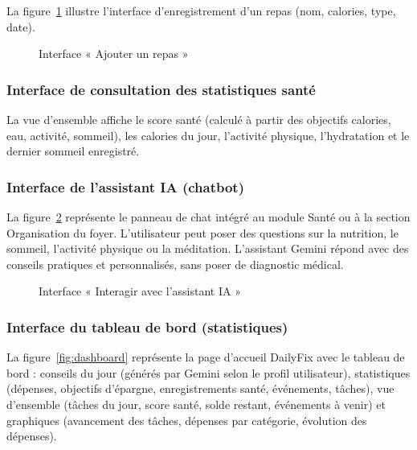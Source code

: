 La figure~\ref{fig:meal} illustre l'interface d'enregistrement d'un repas (nom, calories, type, date).

\begin{figure}[H]
\centering
\caption{Interface « Ajouter un repas »}
\label{fig:meal}
\end{figure}

\subsubsection{Interface de consultation des statistiques santé}

La vue d'ensemble affiche le score santé (calculé à partir des objectifs calories, eau, activité, sommeil), les calories du jour, l'activité physique, l'hydratation et le dernier sommeil enregistré.

\subsubsection{Interface de l'assistant IA (chatbot)}

La figure~\ref{fig:chatbot} représente le panneau de chat intégré au module Santé ou à la section Organisation du foyer. L'utilisateur peut poser des questions sur la nutrition, le sommeil, l'activité physique ou la méditation. L'assistant Gemini répond avec des conseils pratiques et personnalisés, sans poser de diagnostic médical.

\begin{figure}[H]
\centering
\caption{Interface « Interagir avec l'assistant IA »}
\label{fig:chatbot}
\end{figure}

\subsubsection{Interface du tableau de bord (statistiques)}

La figure~\ref{fig:dashboard} représente la page d'accueil DailyFix avec le tableau de bord : conseils du jour (générés par Gemini selon le profil utilisateur), statistiques (dépenses, objectifs d'épargne, enregistrements santé, événements, tâches), vue d'ensemble (tâches du jour, score santé, solde restant, événements à venir) et graphiques (avancement des tâches, dépenses par catégorie, évolution des dépenses).

